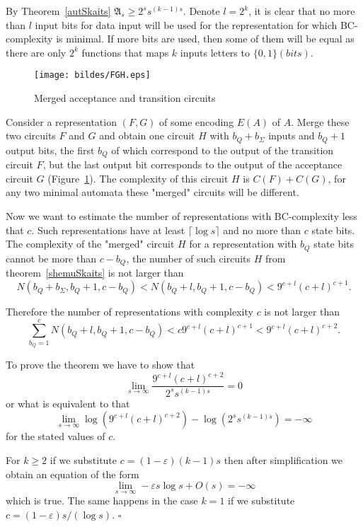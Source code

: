 \documentclass[copyright, creativecommons]{eptcs}
\newcommand{\qed}{$\square$}
\newenvironment{proof}[1][Proof]{\begin{trivlist}
\item[\hskip \labelsep {\bfseries #1}]}{\end{trivlist}}
\begin{document}
\begin{proof}
By Theorem~\ref{autSkaits} $\mathfrak{A}_s\geq 2^{s}s^{(k-1)s}$.
Denote $l=2^k$, it is clear that no more than $l$ input bits for data input will be used for the
representation for which BC-complexity is minimal. If more bits are used, then some of them will be equal as there
are only $2^k$ functions that maps $k$ inputs letters to $\{0, 1\} (bits)$.

\begin{figure}[htb]
	\centering
		\texttt{[image: bildes/FGH.eps]}
	\caption{Merged acceptance and transition circuits}
	\label{FGH}
\end{figure}

Consider a representation $(F, G)$ of some encoding $E(A)$ of $A$.
Merge these two circuits $F$ and $G$ and obtain one circuit $H$ with $b_Q+b_\Sigma$ inputs and $b_Q+1$ output bits,
the first $b_Q$ of which correspond to the output of the transition circuit $F$, but the last output bit corresponds to the output of the acceptance circuit $G$ (Figure~\ref{FGH}).
The complexity of this circuit $H$ is $C(F)+C(G)$,
for any two minimal automata these "merged" circuits will be different.

Now we want to estimate the number of representations with BC-complexity less that $c$.
Such representations have at least $\lceil\log{s}\rceil$ and no more than $c$ state bits.
The complexity of the "merged" circuit $H$ for a representation with $b_Q$ state bits cannot be more than $c-b_Q$,
the number of such circuits $H$ from theorem~\ref{shemuSkaits} is not larger than
$$N(b_Q+b_\Sigma, b_Q+1, c-b_Q)<N(b_Q+l, b_Q+1, c-b_Q)<9^{c+l}(c+l)^{c+1}.$$

Therefore the number of representations with complexity $c$ is not larger than
$$\sum_{b_Q=1}^c N(b_Q+l,b_Q+1, c-b_Q)<c9^{c+l}(c+l)^{c+1}<9^{c+l}(c+l)^{c+2}.$$

To prove the theorem we have to show that
$$\lim_{s\to\infty}\frac{9^{c+l}(c+l)^{c+2}}{2^ss^{(k-1)s}}=0$$
or what is equivalent to that
$$\lim_{s\to\infty}\log{\left (9^{c+l}(c+l)^{c+2}\right )}-\log{\left (2^ss^{(k-1)s}\right )}=-\infty$$
for the stated values of $c$.

For $k\geq 2$ if we substitute $c=(1-\varepsilon)(k-1)s$ then after simplification we obtain an
equation of the form 
$$\lim_{s\to\infty}-\varepsilon s\log{s}+O(s)=-\infty$$
which is true.
The same happens in the case $k=1$ if we substitute $c=(1-\varepsilon)s/(\log{s})$.
\qed
\end{proof}
\end{document}
